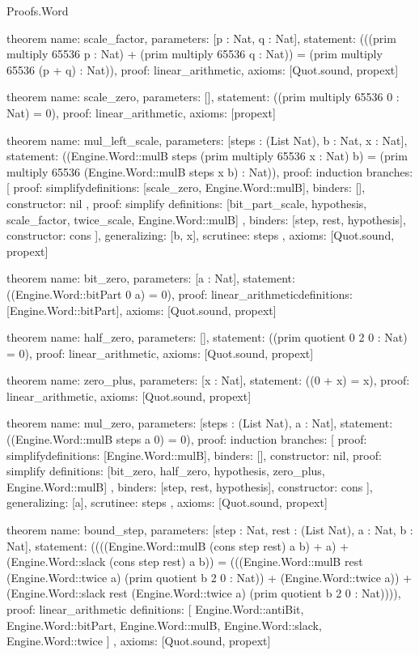 \begin{lexlean}{Proofs.Word}
\begin{semanticmodule}
theorem{
  name: scale_factor,
  parameters: [p : Nat, q : Nat],
  statement: (((prim multiply 65536 p : Nat) + (prim multiply 65536 q : Nat)) = (prim multiply 65536 (p + q) : Nat)),
  proof: linear_arithmetic{},
  axioms: [Quot.sound, propext]
}

theorem{
  name: scale_zero,
  parameters: [],
  statement: ((prim multiply 65536 0 : Nat) = 0),
  proof: linear_arithmetic{},
  axioms: [propext]
}

theorem{
  name: mul_left_scale,
  parameters: [steps : (List Nat), b : Nat, x : Nat],
  statement: ((Engine.Word::mulB steps (prim multiply 65536 x : Nat) b) = (prim multiply 65536 (Engine.Word::mulB steps x b) : Nat)),
  proof: induction{
    branches: [
      {
        proof: simplify{definitions: [scale_zero, Engine.Word::mulB]},
        binders: [],
        constructor: nil
      },
      {
        proof: simplify{
          definitions: [bit_part_scale, hypothesis, scale_factor, twice_scale, Engine.Word::mulB]
        },
        binders: [step, rest, hypothesis],
        constructor: cons
      }
    ],
    generalizing: [b, x],
    scrutinee: steps
  },
  axioms: [Quot.sound, propext]
}

theorem{
  name: bit_zero,
  parameters: [a : Nat],
  statement: ((Engine.Word::bitPart 0 a) = 0),
  proof: linear_arithmetic{definitions: [Engine.Word::bitPart]},
  axioms: [Quot.sound, propext]
}

theorem{
  name: half_zero,
  parameters: [],
  statement: ((prim quotient 0 2 0 : Nat) = 0),
  proof: linear_arithmetic{},
  axioms: [Quot.sound, propext]
}

theorem{
  name: zero_plus,
  parameters: [x : Nat],
  statement: ((0 + x) = x),
  proof: linear_arithmetic{},
  axioms: [Quot.sound, propext]
}

theorem{
  name: mul_zero,
  parameters: [steps : (List Nat), a : Nat],
  statement: ((Engine.Word::mulB steps a 0) = 0),
  proof: induction{
    branches: [
      {proof: simplify{definitions: [Engine.Word::mulB]}, binders: [], constructor: nil},
      {
        proof: simplify{
          definitions: [bit_zero, half_zero, hypothesis, zero_plus, Engine.Word::mulB]
        },
        binders: [step, rest, hypothesis],
        constructor: cons
      }
    ],
    generalizing: [a],
    scrutinee: steps
  },
  axioms: [Quot.sound, propext]
}

theorem{
  name: bound_step,
  parameters: [step : Nat, rest : (List Nat), a : Nat, b : Nat],
  statement: ((((Engine.Word::mulB (cons step rest) a b) + a) + (Engine.Word::slack (cons step rest) a b)) = (((Engine.Word::mulB rest (Engine.Word::twice a) (prim quotient b 2 0 : Nat)) + (Engine.Word::twice a)) + (Engine.Word::slack rest (Engine.Word::twice a) (prim quotient b 2 0 : Nat)))),
  proof: linear_arithmetic{
    definitions: [
      Engine.Word::antiBit,
      Engine.Word::bitPart,
      Engine.Word::mulB,
      Engine.Word::slack,
      Engine.Word::twice
    ]
  },
  axioms: [Quot.sound, propext]
}


\end{semanticmodule}
\end{lexlean}
